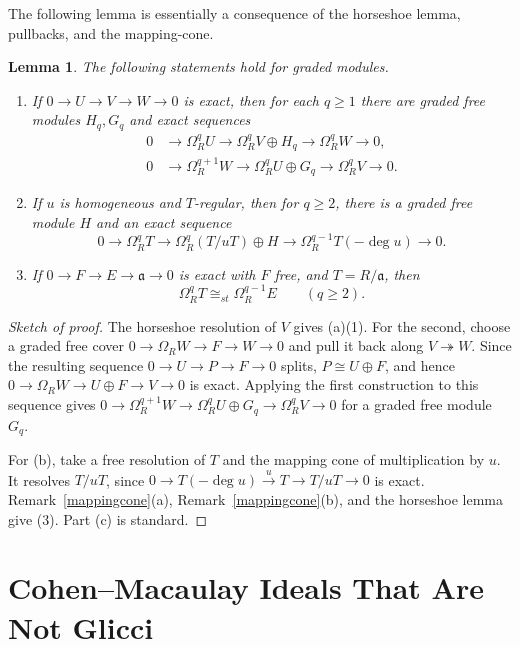 \documentclass[11pt,letterpaper]{amsart}
\newcommand{\x}{\xrightarrow{}}
\theoremstyle{plain}
\newtheorem{lem}[thm]{Lemma}
\theoremstyle{definition}
\theoremstyle{remark}
\begin{document}
The following lemma is essentially a consequence of the horseshoe lemma, pullbacks, and the mapping-cone.


\begin{lem}\label{lem:syz}
The following statements hold for graded modules.
\begin{enumerate}
\item[$(a)$] If $0\to U\to V\to W\to0$ is exact, then for each $q\geq1$ there are graded free modules $H_q,G_q$ and exact sequences
\begin{align}
0&\x\Omega_R^qU\x\Omega_R^qV\oplus H_q\x\Omega_R^qW\x0, \tag{1}\\
0&\x\Omega_R^{q+1}W\x\Omega_R^qU\oplus G_q\x\Omega_R^qV\x0. \tag{2}
\end{align}
\item[$(b)$] If $u$ is homogeneous and $T$-regular, then for $q\geq2$, there is a graded free module $H$ and an exact sequence
\begin{equation}\tag{3}
0\x\Omega_R^qT\x\Omega_R^q(T/uT)\oplus H\x\Omega_R^{q-1}T(-\deg u)\x0.
\end{equation}
\item[$(c)$] If $0\to F\to E\to\mathfrak a\to0$ is exact with $F$ free, and $T=R/\mathfrak a$, then
\[
\Omega_R^qT\cong_{st}\Omega_R^{q-1}E\qquad(q\geq2).
\]
\end{enumerate}
\end{lem}

\begin{proof}[Sketch of proof]
The horseshoe resolution of $V$ gives (a)(1). For the second, choose a graded free cover $0\to\Omega_RW\to F\to W\to0$ and pull it back along $V\twoheadrightarrow W$. Since the resulting sequence $0\to U\to P\to F\to0$ splits, $P\cong U\oplus F$, and hence $0\to\Omega_RW\to U\oplus F\to V\to0$ is exact. Applying the first construction to this sequence gives $0\to\Omega_R^{q+1}W\to\Omega_R^qU\oplus G_q\to\Omega_R^qV\to0$ for a graded free module $G_q$.

For (b), take a free resolution of $T$ and the mapping cone of multiplication by $u$. It resolves $T/uT$, since $0\to T(-\deg u)\xrightarrow{u}T\to T/uT\to0$ is exact. Remark~\ref{mappingcone}(a), Remark~\ref{mappingcone}(b), and the horseshoe lemma give (3). Part (c) is standard.
\end{proof}

\section{Cohen–Macaulay Ideals That Are Not Glicci}
\end{document}
